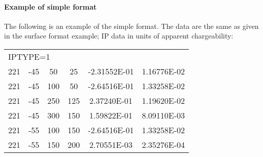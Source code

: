 \paragraph{Example of simple format}

The following is an example of the simple format. The data are the same as given in the surface format example; IP data in units of apparent chargeability:

\begin{fileExample}
\begin{tabular}{|cccccc|}
\hline
\multicolumn{6}{|l|}{IPTYPE=1} \\
221 & -45 &  50 &  25 & -2.31552E-01 & 1.16776E-02 \\
221 & -45 & 100 &  50 & -2.64516E-01 & 1.33258E-02 \\
221 & -45 & 250 & 125 &  2.37240E-01 & 1.19620E-02 \\
221 & -45 & 300 & 150 &  1.59822E-01 & 8.09110E-03 \\
221 & -55 & 100 & 150 & -2.64516E-01 & 1.33258E-02 \\
221 & -55 & 150 & 200 &  2.70551E-03 & 2.35276E-04 \\
\hline
\end{tabular}
\end{fileExample}